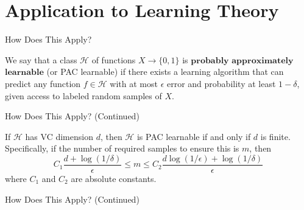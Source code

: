 \documentclass[9pt]{beamer}
\begin{document}
\section{Application to Learning Theory}
\begin{frame}{How Does This Apply?}
    \begin{definition}
    We say that a class $\mathcal{H}$ of functions $X \rightarrow \{0,1\}$ is $\textbf{probably}$ $\textbf{approximately}$ $\textbf{learnable}$ (or PAC learnable) if there exists a learning algorithm that can predict any function $f\in \mathcal{H}$ with at most $\epsilon$ error and probability at least $1 - \delta$, given access to labeled random samples of $X$.
    \end{definition}
\end{frame}
\begin{frame}{How Does This Apply? (Continued)}
    \begin{theorem} 
    If $\mathcal{H}$ has VC dimension $d$, then $\mathcal{H}$ is PAC learnable if and only if $d$ is finite. Specifically, if the number of required samples to ensure this is $m$, then
    $$
    C_1 \frac{d + \log(1/\delta)}{\epsilon} \le m \le C_2 \frac{d \log(1/\epsilon) + \log(1/\delta)}{\epsilon}
    $$
    where $C_1$ and $C_2$ are absolute constants.
    \end{theorem}
\end{frame}
\begin{frame}{How Does This Apply? (Continued)}
\end{frame}
\end{document}
